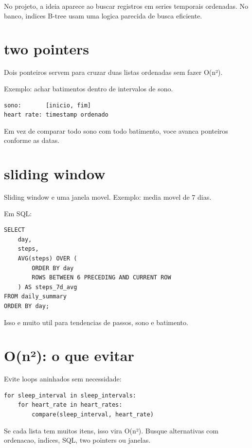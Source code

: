 No projeto, a ideia aparece ao buscar registros em series temporais ordenadas. No banco, indices B-tree usam uma logica parecida de busca eficiente.

\section{two pointers}

Dois ponteiros servem para cruzar duas listas ordenadas sem fazer O(n²).

Exemplo: achar batimentos dentro de intervalos de sono.

\begin{verbatim}
sono:       [inicio, fim]
heart rate: timestamp ordenado
\end{verbatim}

Em vez de comparar todo sono com todo batimento, voce avanca ponteiros conforme as datas.

\section{sliding window}

Sliding window e uma janela movel. Exemplo: media movel de 7 dias.

Em SQL:

\begin{lstlisting}[style=devbuttersql]
SELECT
    day,
    steps,
    AVG(steps) OVER (
        ORDER BY day
        ROWS BETWEEN 6 PRECEDING AND CURRENT ROW
    ) AS steps_7d_avg
FROM daily_summary
ORDER BY day;
\end{lstlisting}

Isso e muito util para tendencias de passos, sono e batimento.

\section{O(n²): o que evitar}

Evite loops aninhados sem necessidade:

\begin{lstlisting}[style=devbutterpython]
for sleep_interval in sleep_intervals:
    for heart_rate in heart_rates:
        compare(sleep_interval, heart_rate)
\end{lstlisting}

Se cada lista tem muitos itens, isso vira O(n²). Busque alternativas com ordenacao, indices, SQL, two pointers ou janelas.
